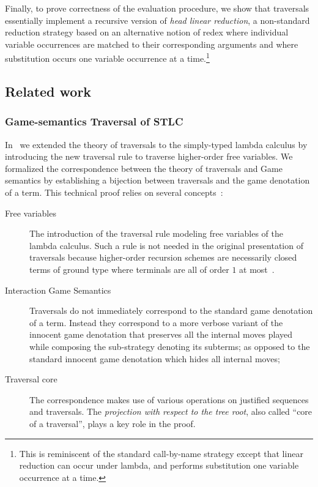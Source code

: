\documentclass{elsarticle}
\theoremstyle{plain}
\theoremstyle{definition}
\theoremstyle{remark}
\begin{document}
Finally, to prove correctness of the evaluation procedure, we show that traversals essentially implement a recursive version of \emph{head linear reduction}, a non-standard reduction strategy based on an alternative notion of redex where individual variable occurrences are matched to their corresponding arguments and where substitution occurs one variable occurrence at a time.\footnote{This is reminiscent of the standard call-by-name strategy except that linear reduction can occur under lambda, and performs substitution one variable occurrence at a time.}

\subsection{Related work}


\subsubsection{Game-semantics Traversal of STLC}

In~\cite{BlumPhd} we extended the theory of traversals to the simply-typed lambda calculus by introducing the new traversal rule  to traverse higher-order free variables. We formalized the correspondence between the theory of traversals and Game semantics by establishing a bijection between traversals and the game denotation of a term. This technical proof relies on several concepts~\cite{BlumPhd}:
\begin{description}
  \item[Free variables] The introduction of the traversal rule  modeling  free variables of the lambda calculus.
  Such a rule is not needed in the original presentation of traversals because higher-order recursion schemes are necessarily closed terms of ground type where terminals are all of order $1$ at most~\cite{Ong2006}.
  \item[Interaction Game Semantics] Traversals do not immediately correspond to the standard game denotation of a term. Instead they correspond to a more verbose variant of the innocent game denotation that preserves all the internal moves played while composing the sub-strategy denoting its subterms; as opposed to the standard innocent game denotation which hides all internal moves;
  \item[Traversal core] The correspondence makes use of various operations on justified sequences and traversals. The \emph{projection with respect to the tree root}, also called  ``core of a traversal'', plays a key role in the proof.
\end{description}
\end{document}
